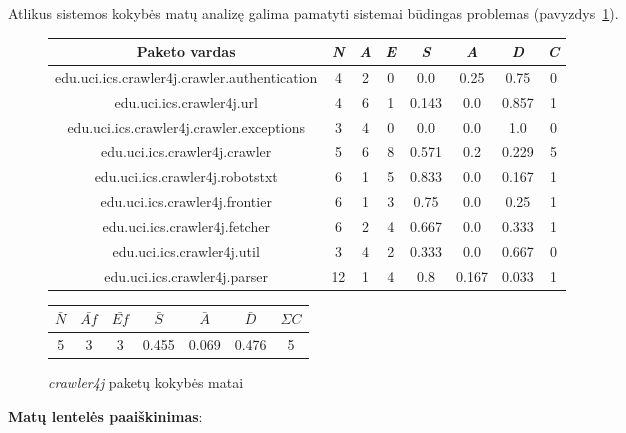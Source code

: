 Atlikus sistemos kokybės matų analizę galima pamatyti sistemai būdingas problemas (pavyzdys~\ref{table:crawlers}).
\begin{figure}[H]
\begin{center}
    \begin{tabular}{|c|c|c|c|c|c|c|c|}
        \hline
        Paketo vardas & \textit{N} & \textit{A} & \textit{E} & \textit{S} & \textit{A} & \textit{D} & \textit{C} \\ [0.5ex]
        \hline\hline
        edu.uci.ics.crawler4j.crawler.authentication & 4 & 2 & 0 & 0.0 & 0.25 & 0.75 & 0\\
        \hline
        edu.uci.ics.crawler4j.url & 4 & 6 & 1 & 0.143 & 0.0 & 0.857 & 1 \\
        \hline
        edu.uci.ics.crawler4j.crawler.exceptions & 3 & 4 & 0 & 0.0 & 0.0 & 1.0 & 0\\
        \hline
        edu.uci.ics.crawler4j.crawler & 5 & 6 & 8 & 0.571 & 0.2 & 0.229 & 5 \\
        \hline
        edu.uci.ics.crawler4j.robotstxt & 6 & 1 & 5 & 0.833 & 0.0 & 0.167 & 1 \\
        \hline
        edu.uci.ics.crawler4j.frontier & 6 & 1 & 3 & 0.75 & 0.0 & 0.25 & 1 \\
        \hline
        edu.uci.ics.crawler4j.fetcher & 6 & 2 & 4 & 0.667 & 0.0 & 0.333 & 1 \\
        \hline
        edu.uci.ics.crawler4j.util & 3 & 4 & 2 & 0.333 & 0.0 & 0.667 & 0 \\
        \hline
        edu.uci.ics.crawler4j.parser & 12 & 1 & 4 & 0.8 & 0.167 & 0.033 & 1 \\
        \hline
    \end{tabular}
    \begin{tabular}{|c|c|c|c|c|c|c|}
        \hline
        $\bar{N}$ & $\bar{Af}$ & $\bar{Ef}$ & $\bar{S}$ & $\bar{A}$ & $\bar{D}$ & $\Sigma C$  \\ [0.5ex]
        \hline\hline
        5 & 3 & 3 & 0.455 & 0.069 & 0.476 & 5\\
        \hline
    \end{tabular}
\end{center}
\caption{\textit{crawler4j} paketų kokybės matai}
\label{table:crawlers}
\end{figure}
\textbf{Matų lentelės paaiškinimas}:

